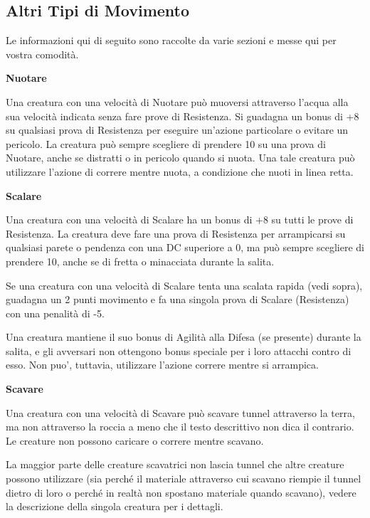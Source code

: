 \documentclass[a4paper,11pt,twoside,openany]{book}
\begin{document}
\subsection{Altri Tipi di Movimento}

\label{altri-tipi-di-movimento}

Le informazioni qui di seguito sono raccolte da varie sezioni e messe qui per vostra comodità.

\textbf{Nuotare}

Una creatura con una velocità di Nuotare può muoversi attraverso l'acqua alla sua velocità indicata senza fare prove di Resistenza. Si guadagna un bonus di +8 su qualsiasi prova di Resistenza per eseguire un'azione particolare o evitare un pericolo. La creatura può sempre scegliere di prendere 10 su una prova di Nuotare, anche se distratti o in pericolo quando si nuota. Una tale creatura può utilizzare l'azione di correre mentre nuota, a condizione che nuoti in linea retta.

\textbf{Scalare}

Una creatura con una velocità di Scalare ha un bonus di +8 su tutti le prove di Resistenza. La creatura deve fare una prova di Resistenza per arrampicarsi su qualsiasi parete o pendenza con una DC superiore a 0, ma può sempre scegliere di prendere 10, anche se di fretta o minacciata durante la salita.

Se una creatura con una velocità di Scalare tenta una scalata rapida (vedi sopra), guadagna un 2 punti movimento e fa una singola prova di Scalare (Resistenza) con una penalità di -5.

Una creatura mantiene il suo bonus di Agilità alla Difesa (se presente) durante la salita, e gli avversari non ottengono bonus speciale per i loro attacchi contro di esso. Non puo', tuttavia, utilizzare l'azione correre mentre si arrampica.

\textbf{Scavare}

Una creatura con una velocità di Scavare può scavare tunnel attraverso la terra, ma non attraverso la roccia a meno che il testo descrittivo non dica il contrario. Le creature non possono caricare o correre mentre scavano.

La maggior parte delle creature scavatrici non lascia tunnel che altre creature possono utilizzare (sia perché il materiale attraverso cui scavano riempie il tunnel dietro di loro o perché in realtà non spostano materiale quando scavano), vedere la descrizione della singola creatura per i dettagli.
\end{document}
